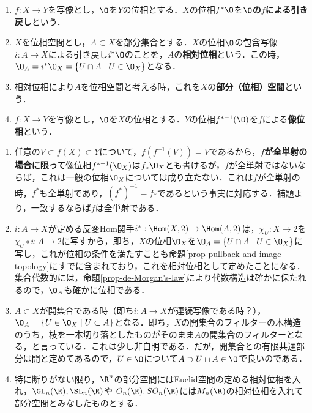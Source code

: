 \documentclass[uplatex,dvipdfmx]{jsreport}
\begin{document}
\begin{definition}\mbox{}\label{def-initial-and-final-topology}
    \begin{enumerate}
        \item $f:X\to Y$を写像とし，$\O$を$Y$の位相とする．$X$の位相$f^*\O$を\textbf{$\O$の$f$による引き戻し}という．
        \item $X$を位相空間とし，$A\subset X$を部分集合とする．$X$の位相$\O$の包含写像$i:A\to X$による引き戻し$i^*\O$のことを，$A$の\textbf{相対位相}という．この時，$\O_A=i^*\O_X=\{U\cap A\mid U\in\O_X\}$となる．
        \item 相対位相により$A$を位相空間と考える時，これを$X$の\textbf{部分（位相）空間}という．
        \item $f:X\to Y$を写像とし，$\O$を$X$の位相とする．$Y$の位相$f^{*-1}(\O)$を$f$による\textbf{像位相}という．
    \end{enumerate}
\end{definition}
\begin{remark}[像位相の別記]\mbox{}
    \begin{enumerate}
        \item 任意の$V\subset f(X)\subset Y$について，$f(f^{-1}(V))=V$であるから，\textbf{$f$が全単射の場合に限って}像位相$f^{*-1}(\O_X)$は$f_*\O_X$とも書けるが，$f$が全単射ではないならば，これは一般の位相$\O_X$については成り立たない．これは$f$が全単射の時，$f^*$も全単射であり，$(f^*)^{-1}=f_*$であるという事実に対応する．補題より，一致するならば$f$は全単射である．
        \item $i:A\to X$が定める反変Hom関手$i^*:\Hom(X,2)\to\Hom(A,2)$は，$\chi_U:X\to 2$を$\chi_U\circ i:A\to 2$に写すから，即ち，$X$の位相$\O_X$を$\O_A=\{U\cap A\mid U\in\O_X\}$に写し，これが位相の条件を満たすことも命題\ref{prop-pullback-and-image-topology}にすでに含まれており，これを相対位相として定めたことになる．集合代数的には，命題\ref{prop-de-Morgan's-law}により代数構造は確かに保たれるので，$\O_A$も確かに位相である．
        \item $A\subset X$が開集合である時（即ち$i:A\to X$が連続写像である時？），$\O_A=\{U\in\O_X\mid U\subset A\}$となる．即ち，$X$の開集合のフィルターの木構造のうち，枝を一本切り落としたものがそのまま$A$の開集合のフィルターとなる，と言っている．これは少し非自明である．だが，開集合との有限共通部分は開と定めてあるので，$U\in\O$について$A\supset U\cap A\in\O$で良いのである．
        \item 特に断りがない限り，$\R^n$の部分空間にはEuclid空間の定める相対位相を入れ，$\GL_n(\R),\SL_n(\R)$や
        $O_n(\R),SO_n(\R)$には$M_n(\R)$の相対位相を入れて部分空間とみなしたものとする．
    \end{enumerate}
\end{remark}
\end{document}
